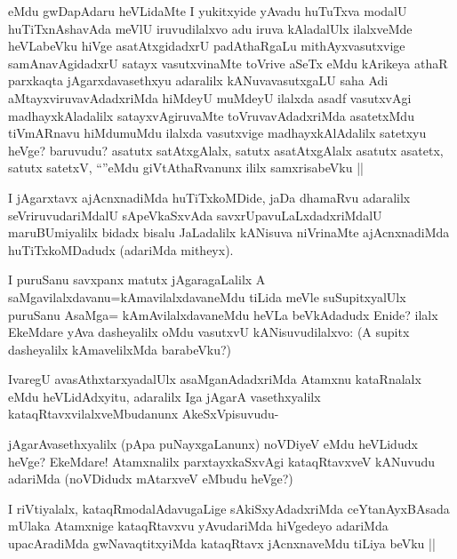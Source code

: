 \begin{artha}
eMdu gwDapAdaru heVLidaMte I yukitxyide yAvadu huTuTxva modalU huTiTxnAshavAda meVlU iruvudilalxvo adu  iruva kAladalUlx ilalxveMde heVLabeVku hiVge asatAtxgidadxrU padAthaRgaLu mithAyxvasutxvige samAnavAgidadxrU satayx vasutxvinaMte toVrive aSeTx eMdu kArikeya athaR parxkaqta jAgarxdavasethxyu adaralilx kANuvavasutxgaLU saha Adi aMtayxviruvavAdadxriMda hiMdeyU muMdeyU ilalxda asadf vasutxvAgi madhayxkAladalilx satayxvAgiruvaMte toVruvavAdadxriMda asatetxMdu tiVmARnavu hiMdumuMdu ilalxda vasutxvige madhayxkAlAdalilx satetxyu heVge? baruvudu? asatutx satAtxgAlalx, satutx asatAtxgAlalx asatutx asatetx, satutx satetxV, ``\stext''eMdu giVtAthaRvanunx ililx samxrisabeVku ||
\end{artha}


\begin{artha}
I jAgarxtavx ajAcnxnadiMda huTiTxkoMDide, jaDa dhamaRvu adaralilx seVriruvudariMdalU sApeVkaSxvAda savxrUpavuLaLxdadxriMdalU maruBUmiyalilx bidadx bisalu JaLadalilx kANisuva niVrinaMte ajAcnxnadiMda huTiTxkoMDadudx (adariMda mitheyx).
\end{artha}

\begin{artha}
I puruSanu savxpanx matutx jAgaragaLalilx A saMgavilalxdavanu=kAmavilalxdavaneMdu tiLida meVle suSupitxyalUlx puruSanu AsaMga= kAmAvilalxdavaneMdu heVLa beVkAdadudx Enide? ilalx EkeMdare yAva dasheyalilx oMdu vasutxvU kANisuvudilalxvo: (A supitx dasheyalilx kAmavelilxMda barabeVku?)
\end{artha}

\begin{artha}
IvaregU avasAthxtarxyadalUlx asaMganAdadxriMda Atamxnu kataRnalalx eMdu heVLidAdxyitu, adaralilx Iga jAgarA vasethxyalilx kataqRtavxvilalxveMbudanunx AkeSxVpisuvudu-
\end{artha}


\begin{artha}
jAgarAvasethxyalilx (pApa puNayxgaLanunx) noVDiyeV eMdu heVLidudx heVge? EkeMdare! Atamxnalilx parxtayxkaSxvAgi kataqRtavxveV kANuvudu adariMda (noVDidudx mAtarxveV eMbudu heVge?)
\end{artha}


\begin{artha}
I riVtiyalalx, kataqRmodalAdavugaLige sAkiSxyAdadxriMda ceYtanAyxBAsada mUlaka Atamxnige kataqRtavxvu yAvudariMda hiVgedeyo adariMda upacAradiMda gwNavaqtitxyiMda kataqRtavx jAcnxnaveMdu tiLiya beVku ||
\end{artha}

